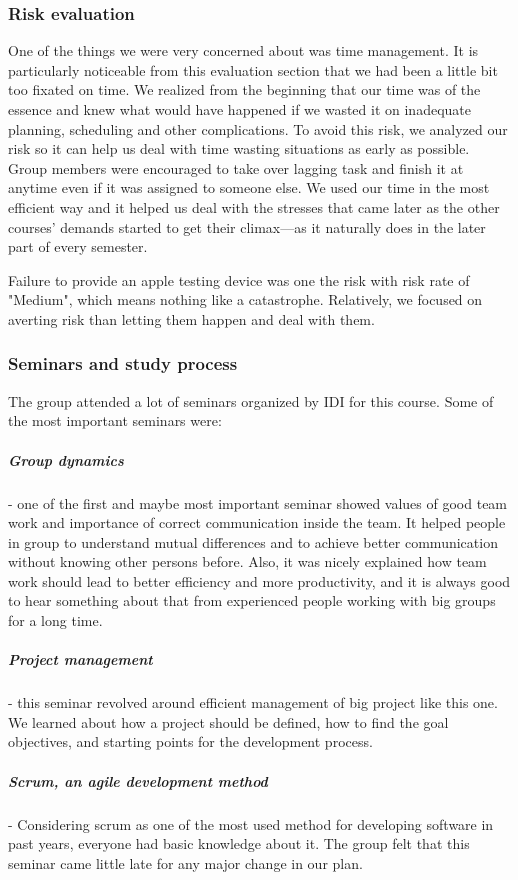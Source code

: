  \subsubsection{Risk evaluation} 
 One of the things we were very concerned about was time management. It is particularly noticeable from this evaluation section that we had been a little bit too fixated on time. We realized from the beginning that our time was of the essence and knew what would have happened if we wasted it on inadequate planning, scheduling and other complications. To avoid this risk, we analyzed our risk so it can help us deal with time wasting situations as early as possible. Group members were encouraged to take over lagging task and finish it at anytime even if it was assigned to someone else. We used our time in the most efficient way and it helped us deal with the stresses that came later as the other courses' demands started to get their climax---as it naturally does in the later part of every semester. 
 
 Failure to provide an apple testing device was one the risk with risk rate of "Medium", which means nothing like a catastrophe. Relatively, we focused on averting risk than letting them happen and deal with them.
	
	\subsubsection{Seminars and study process}
  The group attended a lot of seminars organized by IDI for this course. Some of
  the most important seminars were:
	
  \subparagraph{Group dynamics} - one of the first and maybe most important
  seminar showed values of good team work and importance of correct
  communication inside the team. It helped people in group to understand mutual
  differences and to achieve better communication without knowing other persons
  before. Also, it was nicely explained how team work should lead to better
  efficiency and more productivity, and it is always good to hear something
  about that from experienced people working with big groups for a long time.

  \subparagraph{Project management} - this seminar revolved around efficient
  management of big project like this one. We learned about how a project should
  be defined, how to find the goal objectives, and starting points for the
  development process. 
  
   \subparagraph{Scrum, an agile development method} - Considering scrum as one
   of the most used method for developing software in past years, everyone had
   basic knowledge about it.  The group felt that this seminar came little late
   for any major change in our plan.  

